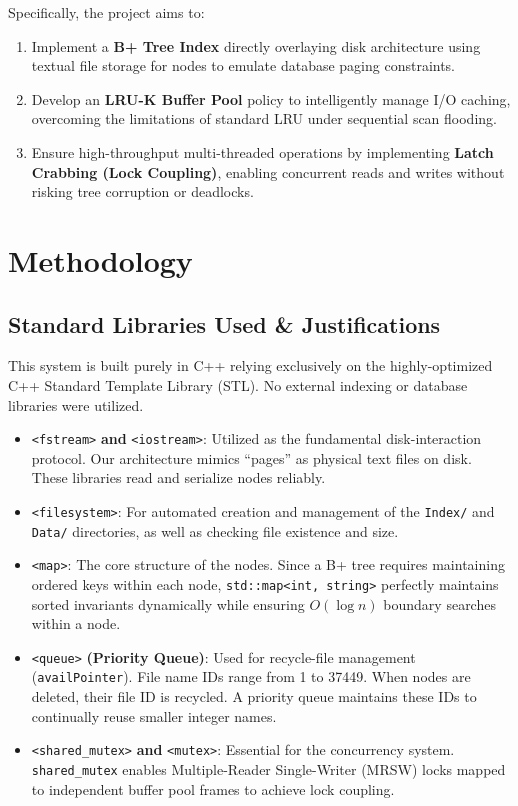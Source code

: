 \documentclass[12pt, a4paper]{article}
\begin{document}
Specifically, the project aims to:
\begin{enumerate}
    \item Implement a \textbf{B+ Tree Index} directly overlaying disk architecture using textual file storage for nodes to emulate database paging constraints.
    \item Develop an \textbf{LRU-K Buffer Pool} policy to intelligently manage I/O caching, overcoming the limitations of standard LRU under sequential scan flooding.
    \item Ensure high-throughput multi-threaded operations by implementing \textbf{Latch Crabbing (Lock Coupling)}, enabling concurrent reads and writes without risking tree corruption or deadlocks.
\end{enumerate}

\section{Methodology}

\subsection{Standard Libraries Used \& Justifications}
This system is built purely in C++ relying exclusively on the highly-optimized C++ Standard Template Library (STL). No external indexing or database libraries were utilized.
\begin{itemize}
    \item \texttt{<fstream>} \textbf{and} \texttt{<iostream>}: Utilized as the fundamental disk-interaction protocol. Our architecture mimics ``pages'' as physical text files on disk. These libraries read and serialize nodes reliably.
    \item \texttt{<filesystem>}: For automated creation and management of the \texttt{Index/} and \texttt{Data/} directories, as well as checking file existence and size.
    \item \texttt{<map>}: The core structure of the nodes. Since a B+ tree requires maintaining ordered keys within each node, \texttt{std::map<int, string>} perfectly maintains sorted invariants dynamically while ensuring $O(\log n)$ boundary searches within a node.
    \item \texttt{<queue>} \textbf{(Priority Queue)}: Used for recycle-file management (\texttt{availPointer}). File name IDs range from 1 to 37449. When nodes are deleted, their file ID is recycled. A priority queue maintains these IDs to continually reuse smaller integer names.
    \item \texttt{<shared\_mutex>} \textbf{and} \texttt{<mutex>}: Essential for the concurrency system. \texttt{shared\_mutex} enables Multiple-Reader Single-Writer (MRSW) locks mapped to independent buffer pool frames to achieve lock coupling.
\end{itemize}
\end{document}
